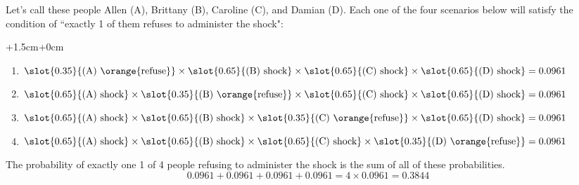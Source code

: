 \documentclass[11pt,containsverbatim,handout]{beamer}
\begin{document}

\begin{frame}

\pause
Let's call these people Allen (A), Brittany (B), Caroline (C), and Damian (D). Each one of the four scenarios below will satisfy the condition of ``exactly 1 of them refuses to administer the shock": \\
\vspace{0.25cm}
\pause
\begin{changemargin}{+1.5cm}{+0cm}
{\footnotesize
\begin{enumerate}
\item[Scenario 1:] $\slot{0.35}{\text{(A) \orange{refuse}}} \times \slot{0.65}{\text{(B) shock}} \times \slot{0.65}{\text{(C) shock}} \times \slot{0.65}{\text{(D) shock}} = 0.0961$
\pause
\item[Scenario 2:] $\slot{0.65}{\text{(A) shock}} \times \slot{0.35}{\text{(B) \orange{refuse}}}\times \slot{0.65}{\text{(C) shock}} \times \slot{0.65}{\text{(D) shock}} = 0.0961$
\pause
\item[Scenario 3:] $\slot{0.65}{\text{(A) shock}} \times \slot{0.65}{\text{(B) shock}} \times \slot{0.35}{\text{(C) \orange{refuse}}}\times \slot{0.65}{\text{(D) shock}} = 0.0961$
\pause
\item[Scenario 4:] $\slot{0.65}{\text{(A) shock}} \times \slot{0.65}{\text{(B) shock}} \times \slot{0.65}{\text{(C) shock}} \times \slot{0.35}{\text{(D) \orange{refuse}}} = 0.0961$
\end{enumerate}
}
\end{changemargin}
\pause
The probability of exactly one 1 of 4 people refusing to administer the shock is the sum of all of these probabilities.
\[ 0.0961+ 0.0961 + 0.0961 + 0.0961 = 4 \times 0.0961 = 0.3844 \]

\end{frame}

\end{document}
